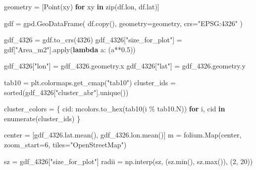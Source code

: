 \documentclass[
  letterpaper,
  DIV=11,
  numbers=noendperiod]{scrreprt}
\newenvironment{Shaded}{\begin{snugshade}}{\end{snugshade}}
\newcommand{\BuiltInTok}[1]{\textcolor[rgb]{0.00,0.23,0.31}{#1}}
\newcommand{\ControlFlowTok}[1]{\textcolor[rgb]{0.00,0.23,0.31}{\textbf{#1}}}
\newcommand{\DecValTok}[1]{\textcolor[rgb]{0.68,0.00,0.00}{#1}}
\newcommand{\FloatTok}[1]{\textcolor[rgb]{0.68,0.00,0.00}{#1}}
\newcommand{\KeywordTok}[1]{\textcolor[rgb]{0.00,0.23,0.31}{\textbf{#1}}}
\newcommand{\NormalTok}[1]{\textcolor[rgb]{0.00,0.23,0.31}{#1}}
\newcommand{\OperatorTok}[1]{\textcolor[rgb]{0.37,0.37,0.37}{#1}}
\newcommand{\StringTok}[1]{\textcolor[rgb]{0.13,0.47,0.30}{#1}}
\begin{document}
\begin{Shaded}
\begin{Highlighting}[]
\NormalTok{geometry }\OperatorTok{=}\NormalTok{ [Point(xy) }\ControlFlowTok{for}\NormalTok{ xy }\KeywordTok{in} \BuiltInTok{zip}\NormalTok{(df.lon, df.lat)]}

\NormalTok{gdf }\OperatorTok{=}\NormalTok{ gpd.GeoDataFrame(}
\NormalTok{    df.copy(), }
\NormalTok{    geometry}\OperatorTok{=}\NormalTok{geometry,}
\NormalTok{    crs}\OperatorTok{=}\StringTok{"EPSG:4326"}
\NormalTok{)}

\NormalTok{gdf\_4326 }\OperatorTok{=}\NormalTok{ gdf.to\_crs(}\DecValTok{4326}\NormalTok{)}
\NormalTok{gdf\_4326[}\StringTok{"size\_for\_plot"}\NormalTok{] }\OperatorTok{=}\NormalTok{ gdf[}\StringTok{"Area\_m2"}\NormalTok{].}\BuiltInTok{apply}\NormalTok{(}\KeywordTok{lambda}\NormalTok{ a: (a}\OperatorTok{**}\FloatTok{0.5}\NormalTok{))}

\NormalTok{gdf\_4326[}\StringTok{"lon"}\NormalTok{] }\OperatorTok{=}\NormalTok{ gdf\_4326.geometry.x}
\NormalTok{gdf\_4326[}\StringTok{"lat"}\NormalTok{] }\OperatorTok{=}\NormalTok{ gdf\_4326.geometry.y}

\NormalTok{tab10 }\OperatorTok{=}\NormalTok{ plt.colormaps.get\_cmap(}\StringTok{"tab10"}\NormalTok{)}
\NormalTok{cluster\_ids }\OperatorTok{=} \BuiltInTok{sorted}\NormalTok{(gdf\_4326[}\StringTok{"cluster\_abr"}\NormalTok{].unique())}

\NormalTok{cluster\_colors }\OperatorTok{=}\NormalTok{ \{}
\NormalTok{    cid: mcolors.to\_hex(tab10(i }\OperatorTok{\%}\NormalTok{ tab10.N))}
    \ControlFlowTok{for}\NormalTok{ i, cid }\KeywordTok{in} \BuiltInTok{enumerate}\NormalTok{(cluster\_ids)}
\NormalTok{\}}

\NormalTok{center }\OperatorTok{=}\NormalTok{ [gdf\_4326.lat.mean(), gdf\_4326.lon.mean()]}
\NormalTok{m }\OperatorTok{=}\NormalTok{ folium.Map(center, zoom\_start}\OperatorTok{=}\DecValTok{6}\NormalTok{, tiles}\OperatorTok{=}\StringTok{"OpenStreetMap"}\NormalTok{)}

\NormalTok{sz }\OperatorTok{=}\NormalTok{ gdf\_4326[}\StringTok{"size\_for\_plot"}\NormalTok{]}
\NormalTok{radii }\OperatorTok{=}\NormalTok{ np.interp(sz, (sz.}\BuiltInTok{min}\NormalTok{(), sz.}\BuiltInTok{max}\NormalTok{()), (}\DecValTok{2}\NormalTok{, }\DecValTok{20}\NormalTok{))}


\end{Highlighting}
\end{Shaded}
\end{document}
